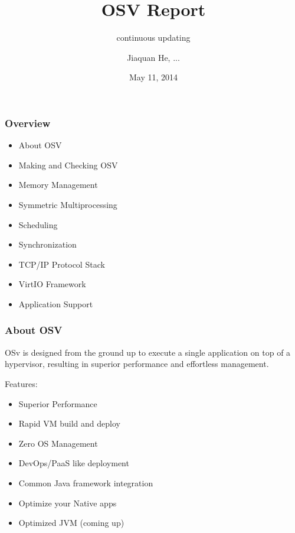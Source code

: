 \documentclass[10pt]{beamer}
\title{OSV Report}
\subtitle{continuous updating}
\author[Jiaquan He, ...]{Jiaquan He, ...}
\institute[THCSOS]{
	THCSOS
}
\date{May 11, 2014}
\begin{document}
\begin{frame}[plain]
	\titlepage
\end{frame}


\begin{frame}
	\frametitle{Overview}

\begin{itemize}
	\item About OSV
	\item Making and Checking OSV
	\item Memory Management
	\item Symmetric Multiprocessing
	\item Scheduling
	\item Synchronization
	\item TCP/IP Protocol Stack
	\item VirtIO Framework
	\item Application Support
\end{itemize}

\end{frame}


\begin{frame}
	\frametitle{About OSV}

	OSv is designed from the ground up to execute a single application on top of a hypervisor, resulting in superior performance and effortless management.

	\bigskip
	\pause

	Features: 
	\begin{itemize}
		\item Superior Performance
		\item Rapid VM build and deploy
		\item Zero OS Management
		\item DevOps/PaaS like deployment
		\item Common Java framework integration
		\item Optimize your Native apps
		\item Optimized JVM (coming up)
	\end{itemize}

\end{frame}
\end{document}
